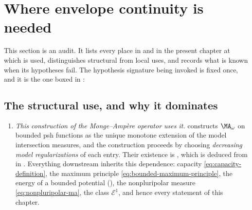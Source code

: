 \section{Where envelope continuity is needed}
\label{sec:ch27-where-continuity}

This section is an audit.  It lists every place in
 and in the present
chapter at which  is used, distinguishes
structural from local uses, and records what is known when its hypotheses
fail.  The hypothesis signature being invoked is fixed once, and it is the
one boxed in :

\begin{center}
\end{center}

\subsection{The structural use, and why it dominates}
\label{sec:ch27-structural-use}

\begin{enumerate}
\item[\textup{(EC1)}]
\emph{This construction of the Monge--Amp\`ere operator uses it.}
 constructs $\MA_\omega$ on bounded psh
functions as the unique monotone extension of the model intersection
measures, and the construction proceeds by choosing \emph{decreasing model
regularizations} of each entry.  Their existence is
, which is deduced from
 in
.  Everything downstream
inherits this dependence: capacity \eqref{eq:capacity-definition}, the
maximum principle \eqref{eq:bounded-maximum-principle}, the energy of a
bounded potential (), the
nonpluripolar measure \eqref{eq:nonpluripolar-ma}, the class
$\mathcal E^1$, and hence every statement of this chapter.
\end{enumerate}

